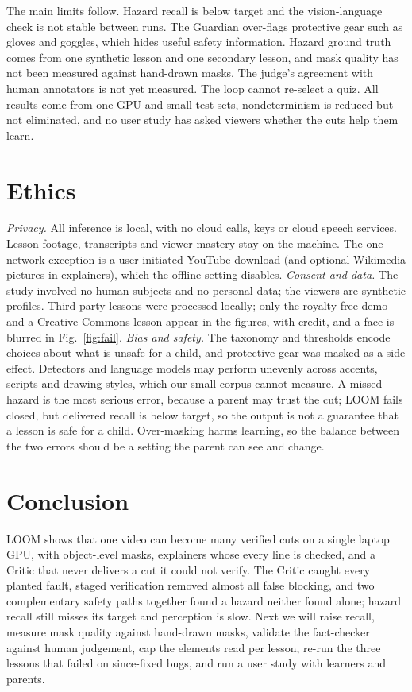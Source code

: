 \documentclass[conference,a4paper]{IEEEtran}
\newcommand{\fig}[1]{Fig.~\ref{#1}}
\begin{document}
The main limits follow. Hazard recall is below target and the vision-language check is not stable between runs. The
Guardian over-flags protective gear such as gloves and goggles, which hides useful safety information. Hazard ground
truth comes from one synthetic lesson and one secondary lesson, and mask quality has not been measured against
hand-drawn masks. The judge's agreement with human annotators is not yet measured. The loop cannot re-select a quiz.
All results come from one GPU and small test sets, nondeterminism is reduced but not eliminated, and no user study has
asked viewers whether the cuts help them learn.

\section{Ethics}
\emph{Privacy.} All inference is local, with no cloud calls, keys or cloud speech services. Lesson footage, transcripts
and viewer mastery stay on the machine. The one network exception is a user-initiated YouTube download (and optional
Wikimedia pictures in explainers), which the offline setting disables.
\emph{Consent and data.} The study involved no human subjects and no personal data; the viewers are synthetic profiles.
Third-party lessons were processed locally; only the royalty-free demo and a Creative Commons lesson appear in the
figures, with credit, and a face is blurred in \fig{fig:fail}.
\emph{Bias and safety.} The taxonomy and thresholds encode choices about what is unsafe for a child, and protective
gear was masked as a side effect. Detectors and language models may perform unevenly across accents, scripts and
drawing styles, which our small corpus cannot measure. A missed hazard is the most serious error, because a parent may
trust the cut; LOOM fails closed, but delivered recall is below target, so the output is not a guarantee that a lesson
is safe for a child. Over-masking harms learning, so the balance between the two errors should be a setting the parent
can see and change.

\section{Conclusion}
LOOM shows that one video can become many verified cuts on a single laptop GPU, with object-level masks, explainers
whose every line is checked, and a Critic that never delivers a cut it could not verify. The Critic caught every planted
fault, staged verification removed almost all false blocking, and two complementary safety paths together found a
hazard neither found alone; hazard recall still misses its target and perception is slow. Next we will raise recall,
measure mask quality against hand-drawn masks, validate the fact-checker against human judgement, cap the elements
read per lesson, re-run the three lessons that failed on since-fixed bugs, and run a user study with learners and
parents.
\end{document}
